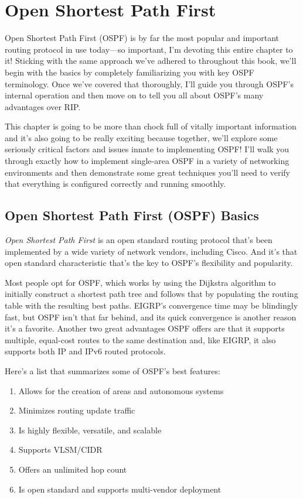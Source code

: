 \chapter{Open Shortest Path First}
\label{chap:ospf}

Open Shortest Path First (OSPF) is by far the most popular and important
routing protocol in use today---so important, I'm devoting this entire
chapter to it! Sticking with the same approach we've adhered to
throughout this book, we'll begin with the basics by completely
familiarizing you with key OSPF terminology. Once we've covered that
thoroughly, I'll guide you through OSPF's internal operation and then
move on to tell you all about OSPF's many advantages over RIP.

This chapter is going to be more than chock full of vitally important
information and it's also going to be really exciting because together,
we'll explore some seriously critical factors and issues innate to
implementing OSPF! I'll walk you through exactly how to implement
single-area OSPF in a variety of networking environments and then
demonstrate some great techniques you'll need to verify that everything
is configured correctly and running smoothly.



\section{Open Shortest Path First (OSPF) Basics}

\emph{Open Shortest Path First} is an open standard routing protocol
that's been implemented by a wide variety of network vendors, including
Cisco. And it's that open standard characteristic that's the key to
OSPF's flexibility and popularity.

Most people opt for OSPF, which works by using the Dijkstra algorithm to
initially construct a shortest path tree and follows that by populating
the routing table with the resulting best paths. EIGRP's convergence
time may be blindingly fast, but OSPF isn't that far behind, and its
quick convergence is another reason it's a favorite. Another two great
advantages OSPF offers are that it supports multiple, equal-cost routes
to the same destination and, like EIGRP, it also supports both IP and
IPv6 routed protocols.

Here's a list that summarizes some of OSPF's best features:

\begin{enumerate}
\tightlist
\item
  Allows for the creation of areas and autonomous systems
\item
  Minimizes routing update traffic
\item
  Is highly flexible, versatile, and scalable
\item
  Supports VLSM/CIDR
\item
  \protect\hypertarget{c18.xhtmlux5cux23Page_747}{}{}Offers an unlimited
  hop count
\item
  Is open standard and supports multi-vendor deployment
\end{enumerate}

